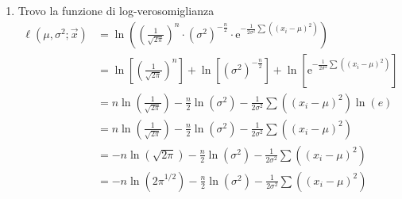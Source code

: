 \documentclass{article}  %
\theoremstyle{definition}
\begin{document}
\begin{esempio}
\begin{enumerate}
\begin{align*}
			                                          & = \left(\frac{1}{\sqrt{2 \pi}}\right)^n \cdot \frac{1^n}{\left(\sigma^2\right)^\frac{n}{2}} \cdot \mathrm{e}^{-\frac{1}{2\sigma^2} \sum \left(\left({x_i-\mu}\right)^2\right)}                \\
			                                          & = \left(\frac{1}{\sqrt{2 \pi}}\right)^n \cdot \left(\frac{1}{\sigma^2}\right)^\frac{n}{2} \cdot \mathrm{e}^{-\frac{1}{2\sigma^2} \sum \left(\left({x_i-\mu}\right)^2\right)}                  \\
			                                          & = \left(\frac{1}{\sqrt{2 \pi}}\right)^n \cdot \left(\sigma^2\right)^{-\frac{n}{2}} \cdot \mathrm{e}^{-\frac{1}{2\sigma^2} \sum \left(\left({x_i-\mu}\right)^2\right)}
		      \end{align*}
		\item Trovo la funzione di log-verosomiglianza
		      \begin{align*}
			      \ell(\mu, \sigma^2; \vec{x}) & = \ln \left(\left(\frac{1}{\sqrt{2 \pi}}\right)^n \cdot \left(\sigma^2\right)^{-\frac{n}{2}} \cdot \mathrm{e}^{-\frac{1}{2\sigma^2} \sum \left(\left({x_i-\mu}\right)^2\right)}\right)                        \\
			                                   & = \ln\left[\left(\frac{1}{\sqrt{2 \pi}}\right)^n\right] + \ln\left[\left(\sigma^2\right)^{-\frac{n}{2}}\right] + \ln\left[\mathrm{e}^{-\frac{1}{2\sigma^2} \sum \left(\left({x_i-\mu}\right)^2\right)}\right] \\
			                                   & = n \ln \left(\frac{1}{\sqrt{2 \pi}}\right) - \frac{n}{2} \ln \left(\sigma^2\right) -\frac{1}{2\sigma^2} \sum \left(\left({x_i-\mu}\right)^2\right) \ln (e)                                                   \\
			                                   & = n \ln \left(\frac{1}{\sqrt{2 \pi}}\right) - \frac{n}{2} \ln \left(\sigma^2\right) -\frac{1}{2\sigma^2} \sum \left(\left({x_i-\mu}\right)^2\right)                                                           \\
			                                   & = - n \ln \left(\sqrt{2 \pi}\right) - \frac{n}{2} \ln \left(\sigma^2\right) -\frac{1}{2\sigma^2} \sum \left(\left({x_i-\mu}\right)^2\right)                                                                   \\
			                                   & = - n \ln \left({2 \pi}^{1/2}\right) - \frac{n}{2} \ln \left(\sigma^2\right) -\frac{1}{2\sigma^2} \sum \left(\left({x_i-\mu}\right)^2\right)                                                                  \\

\end{align*}
\end{enumerate}
\end{esempio}
\end{document}
